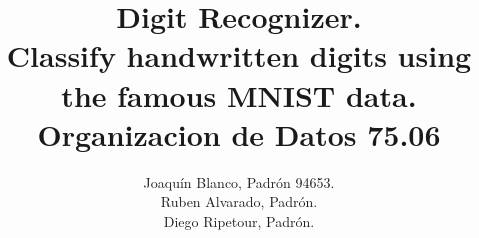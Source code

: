 \documentclass[a4paper,11pt]{report}
\title{Digit Recognizer. \\ 
  Classify handwritten digits using the famous MNIST data.\\
  Organizacion de Datos 75.06}
\author{Joaquín Blanco, Padrón 94653.\\
  Ruben Alvarado, Padrón.\\
  Diego Ripetour, Padrón.}
\begin{document}
\maketitle
\tableofcontents

\begin{abstract}
\end{abstract}

\chapter{}
\end{document}
